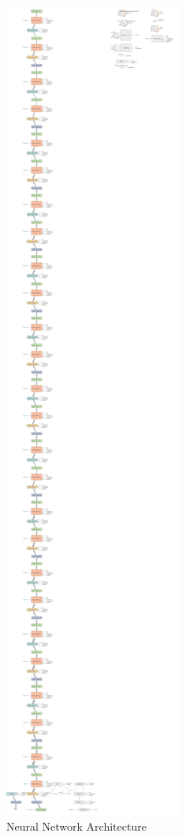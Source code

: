 \documentclass{article}
\begin{document}
\newpage
\begin{figure}[H]
    \centering
    \includegraphics[height=0.9\textheight]{architecture.png}
    \caption{Neural Network Architecture}
    \label{architecture}
\end{figure}
\end{document}
